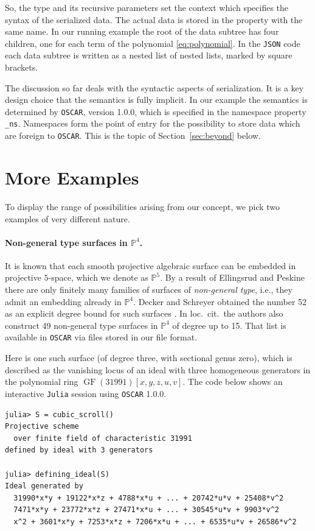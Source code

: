 \documentclass[runningheads]{llncs}
\newcommand\OSCAR{\texttt{OSCAR}\xspace}
\newcommand\Julia{\texttt{Julia}\xspace}
\newcommand\JSON{\texttt{JSON}\xspace}
\newcommand\PP{{\mathbb P}}
\newcommand\GF[1]{\operatorname{GF}(#1)}
\begin{document}
So, the type and its recursive parameters set the context which specifies the syntax of the serialized data.
The actual data is stored in the property with the same name.
In our running example the root of the data subtree has four children, one for each term of the polynomial \eqref{eq:polynomial}.
In the \JSON code each data subtree is written as a nested list of nested lists, marked by square brackets.

The discussion so far deals with the syntactic aspects of serialization.
It is a key design choice that the semantics is fully implicit.
In our example the semantics is determined by \OSCAR, version 1.0.0, which is specified in the namespace property \texttt{\_ns}.
Namespaces form the point of entry for the possibility to store data which are foreign to \OSCAR.
This is the topic of Section~\ref{sec:beyond} below.

\section{More Examples}
\label{sec:more}
To display the range of possibilities arising from our concept, we pick two examples of very different nature.

\paragraph{Non-general type surfaces in $\PP^4$.}
It is known that each smooth projective algebraic surface can be embedded in projective $5$-space, which we denote as $\PP^5$.
By a result of Ellingsrud and Peskine \cite{EllingsrudPeskine:1989} there are only finitely many families of surfaces of \emph{non-general type}, i.e., they admit an embedding already in $\PP^4$.
Decker and Schreyer obtained the number 52 as an explicit degree bound for such surfaces \cite{DeckerSchreyer:2000}.
In loc.\ cit.\ the authors also construct 49 non-general type surfaces in $\PP^4$ of degree up to 15.
That list is available in \OSCAR via files stored in our file format.

Here is one such surface (of degree three, with sectional genus zero), which is described as the vanishing locus of an ideal with three homogeneous generators in the polynomial ring $\GF{31991}[x,y,z,u,v]$.
The code below shows an interactive \Julia session using \OSCAR 1.0.0.
\begin{verbatim}
julia> S = cubic_scroll()
Projective scheme
  over finite field of characteristic 31991
defined by ideal with 3 generators

julia> defining_ideal(S)
Ideal generated by
  31990*x*y + 19122*x*z + 4788*x*u + ... + 20742*u*v + 25408*v^2
  7471*x*y + 23772*x*z + 27471*x*u + ... + 30545*u*v + 9903*v^2
  x^2 + 3601*x*y + 7253*x*z + 7206*x*u + ... + 6535*u*v + 26586*v^2
\end{verbatim}
\end{document}
